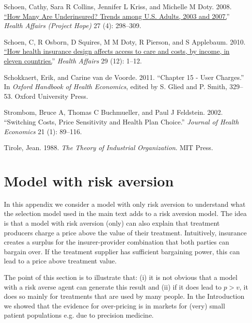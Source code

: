 \documentclass[a4paper,12pt]{article}
\begin{document}
\hypertarget{citeproc_bib_item_37}{Schoen, Cathy, Sara R Collins, Jennifer L Kriss, and Michelle M Doty. 2008. \href{https://www.ncbi.nlm.nih.gov/pubmed/18544591}{“How Many Are Underinsured? Trends among U.S. Adults, 2003 and 2007.}” \textit{Health Affairs (Project Hope)} 27 (4): 298–309.}

\hypertarget{citeproc_bib_item_38}{Schoen, C, R Osborn, D Squires, M M Doty, R Pierson, and S Applebaum. 2010. \href{https://www.ncbi.nlm.nih.gov/pubmed/21088012}{“How health insurance design affects access to care and costs, by income, in eleven countries.}” \textit{Health Affairs} 29 (12): 1–12.}

\hypertarget{citeproc_bib_item_39}{Schokkaert, Erik, and Carine van de Voorde. 2011. “Chapter 15 - User Charges.” In \textit{Oxford Handbook of Health Economics}, edited by S. Glied and P. Smith, 329–53. Oxford University Press.}

\hypertarget{citeproc_bib_item_40}{Strombom, Bruce A, Thomas C Buchmueller, and Paul J Feldstein. 2002. “Switching Costs, Price Sensitivity and Health Plan Choice.” \textit{Journal of Health Economics} 21 (1): 89–116.}

\hypertarget{citeproc_bib_item_41}{Tirole, Jean. 1988. \textit{The Theory of Industrial Organization}. MIT Press.}\bigskip



\newpage
\appendix



\setcounter{table}{0}
\renewcommand{\thetable}{\thesection\arabic{table}}


\section{Model with risk aversion}
\label{sec:orgf8d9995}

In this appendix we consider a model with only risk aversion to understand what the selection model used in the main text adds to a risk aversion model. The idea is that a model with risk aversion (only) can also explain that treatment producers charge a price above the value of their treatment. Intuitively, insurance creates a surplus for the insurer-provider combination that both parties can bargain over. If the treatment supplier has sufficient bargaining power, this can lead to a price above treatment value.

The point of this section is to illustrate that: (i) it is not obvious that a model with a risk averse agent can generate this result and (ii) if it does lead to \(p>v\), it does so mainly for treatments that are used by many people. In the Introduction we showed that the evidence for over-pricing is in markets for (very) small patient populations e.g. due to precision medicine.
\end{document}
